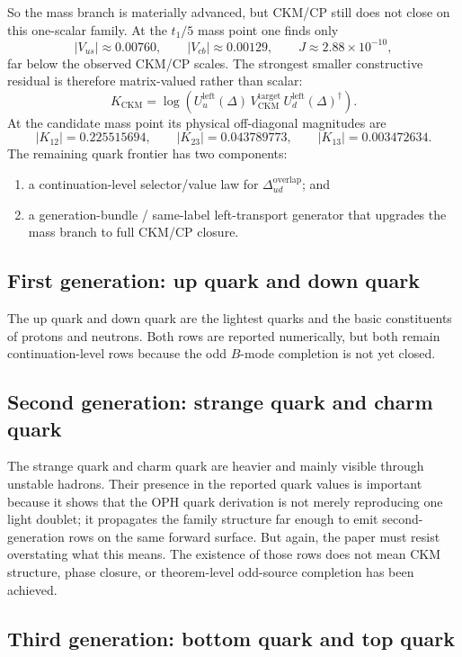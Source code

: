 \documentclass[11pt]{article}
\begin{document}
So the mass branch is materially advanced, but CKM/CP still does not close on this one-scalar
family. At the \(t_1/5\) mass point one finds only
\[
|V_{us}| \approx 0.00760,
\qquad
|V_{cb}| \approx 0.00129,
\qquad
J \approx 2.88\times10^{-10},
\]
far below the observed CKM/CP scales. The strongest smaller constructive residual is therefore
matrix-valued rather than scalar:
\[
K_{\mathrm{CKM}}
=
\log\!\left(
U_u^{\mathrm{left}}(\Delta)\,
V_{\mathrm{CKM}}^{\mathrm{target}}\,
U_d^{\mathrm{left}}(\Delta)^\dagger
\right).
\]
At the candidate mass point its physical off-diagonal magnitudes are
\[
|K_{12}| = 0.225515694,
\qquad
|K_{23}| = 0.043789773,
\qquad
|K_{13}| = 0.003472634.
\]
The remaining quark frontier has two components:
\begin{enumerate}[leftmargin=2em]
\item a continuation-level selector/value law for \(\Delta_{ud}^{\mathrm{overlap}}\); and
\item a generation-bundle / same-label left-transport generator that upgrades the mass branch to full CKM/CP closure.
\end{enumerate}

\subsection{First generation: up quark and down quark}

The up quark and down quark are the lightest quarks and the basic constituents of protons and
neutrons. Both rows are reported numerically, but both remain continuation-level rows because the
odd \(B\)-mode completion is not yet closed.

\subsection{Second generation: strange quark and charm quark}

The strange quark and charm quark are heavier and mainly visible through unstable hadrons. Their
presence in the reported quark values is important because it shows that the OPH quark
derivation is not merely reproducing one light doublet; it propagates the family structure far
enough to emit second-generation rows on the same forward surface. But again, the paper
must resist overstating what this means. The existence of those rows does not mean CKM structure,
phase closure, or theorem-level odd-source completion has been achieved.

\subsection{Third generation: bottom quark and top quark}
\end{document}
